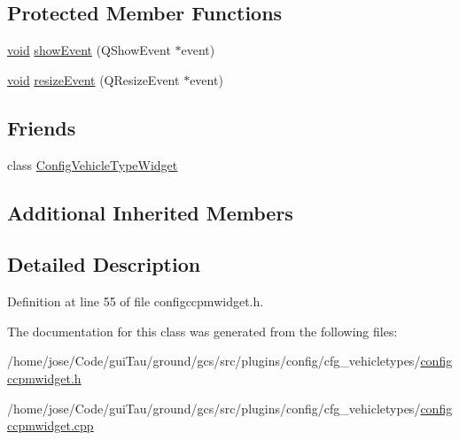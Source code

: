\subsection*{Protected Member Functions}
\begin{DoxyCompactItemize}
\item 
\hyperlink{group___u_a_v_objects_plugin_ga444cf2ff3f0ecbe028adce838d373f5c}{void} \hyperlink{group___config_plugin_ga400903af96a9e0b31101d06356f267fe}{show\-Event} (Q\-Show\-Event $\ast$event)
\item 
\hyperlink{group___u_a_v_objects_plugin_ga444cf2ff3f0ecbe028adce838d373f5c}{void} \hyperlink{group___config_plugin_gaa76c187cd732f13b15ee909af137487f}{resize\-Event} (Q\-Resize\-Event $\ast$event)
\end{DoxyCompactItemize}
\subsection*{Friends}
\begin{DoxyCompactItemize}
\item 
class \hyperlink{group___config_plugin_gaf1f904d5df6619518f3228b2d5d238d0}{Config\-Vehicle\-Type\-Widget}
\end{DoxyCompactItemize}
\subsection*{Additional Inherited Members}


\subsection{Detailed Description}


Definition at line 55 of file configccpmwidget.\-h.



The documentation for this class was generated from the following files\-:\begin{DoxyCompactItemize}
\item 
/home/jose/\-Code/gui\-Tau/ground/gcs/src/plugins/config/cfg\-\_\-vehicletypes/\hyperlink{configccpmwidget_8h}{configccpmwidget.\-h}\item 
/home/jose/\-Code/gui\-Tau/ground/gcs/src/plugins/config/cfg\-\_\-vehicletypes/\hyperlink{configccpmwidget_8cpp}{configccpmwidget.\-cpp}\end{DoxyCompactItemize}
